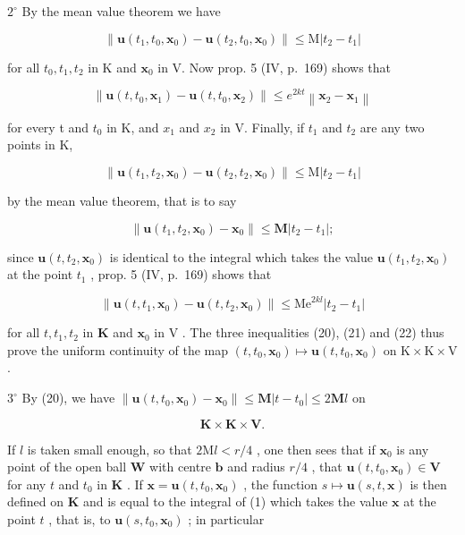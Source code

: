 \(2^{\circ}\) By the mean value theorem we have

\[
\left\| \mathbf {u} (t _ {1}, t _ {0}, \mathbf {x} _ {0}) - \mathbf {u} (t _ {2}, t _ {0}, \mathbf {x} _ {0}) \right\| \leqslant \mathrm{M} \left| t _ {2} - t _ {1} \right|\tag{20}
\]

for all \(t_0, t_1, t_2\) in K and \(\mathbf{x}_0\) in V. Now prop. 5 (IV, p.~169) shows that

\[
\left\| \mathbf {u} (t, t _ {0}, \mathbf {x} _ {1}) - \mathbf {u} (t, t _ {0}, \mathbf {x} _ {2}) \right\| \leqslant e ^ {2 k t} \left\| \mathbf {x} _ {2} - \mathbf {x} _ {1} \right\|\tag{21}
\]

for every t and \(t_{0}\) in K, and \(x_{1}\) and \(x_{2}\) in V. Finally, if \(t_{1}\) and \(t_{2}\) are any two points in K,

\[
\left\| \mathbf {u} \left(t _ {1}, t _ {2}, \mathbf {x} _ {0}\right) - \mathbf {u} \left(t _ {2}, t _ {2}, \mathbf {x} _ {0}\right) \right\| \leqslant \mathrm{M} \left| t _ {2} - t _ {1} \right|
\]

by the mean value theorem, that is to say

\[
\left\| \mathbf {u} (t _ {1}, t _ {2}, \mathbf {x} _ {0}) - \mathbf {x} _ {0} \right\| \leqslant \mathbf {M} \left| t _ {2} - t _ {1} \right|;
\]

since \(\mathbf{u}(t, t_2, \mathbf{x}_0)\) is identical to the integral which takes the value \(\mathbf{u}(t_1, t_2, \mathbf{x}_0)\) at the point \(t_1\) , prop. 5 (IV, p.~169) shows that

\[
\left\| \mathbf {u} (t, t _ {1}, \mathbf {x} _ {0}) - \mathbf {u} (t, t _ {2}, \mathbf {x} _ {0}) \right\| \leqslant \mathrm{Me} ^ {2 k l} | t _ {2} - t _ {1} |\tag{22}
\]

for all \(t, t_{1}, t_{2}\) in \(\mathbf{K}\) and \(\mathbf{x}_{0}\) in \(\mathrm{V}\) . The three inequalities (20), (21) and (22) thus prove the uniform continuity of the map \((t, t_{0}, \mathbf{x}_{0}) \mapsto \mathbf{u}(t, t_{0}, \mathbf{x}_{0})\) on \(\mathrm{K} \times \mathrm{K} \times \mathrm{V}\) .

\(3^{\circ}\) By (20), we have \(\|\mathbf{u}(t, t_{0}, \mathbf{x}_{0}) - \mathbf{x}_{0}\| \leqslant \mathbf{M} |t - t_{0}| \leqslant 2\mathbf{M}l\) on

\[
\mathbf {K} \times \mathbf {K} \times \mathbf {V}.
\]

If \(l\) is taken small enough, so that \(2\mathrm{M}l < r / 4\) , one then sees that if \(\mathbf{x}_0\) is any point of the open ball \(\mathbf{W}\) with centre \(\mathbf{b}\) and radius \(r / 4\) , that \(\mathbf{u}(t,t_0,\mathbf{x}_0)\in \mathbf{V}\) for any \(t\) and \(t_0\) in \(\mathbf{K}\) . If \(\mathbf{x} = \mathbf{u}(t,t_0,\mathbf{x}_0)\) , the function \(s\mapsto \mathbf{u}(s,t,\mathbf{x})\) is then defined on \(\mathbf{K}\) and is equal to the integral of (1) which takes the value \(\mathbf{x}\) at the point \(t\) , that is, to \(\mathbf{u}(s,t_0,\mathbf{x}_0)\) ; in particular

